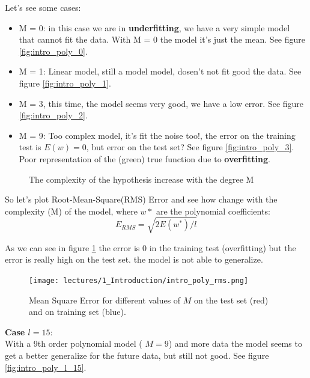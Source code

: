 \documentclass[../main.tex]{subfiles}
\begin{document}
Let's see some cases:
\begin{itemize}
    \item M = 0: in this case we are in \textbf{underfitting}, we have a very simple model that cannot fit the data. With M = 0 the model it's just the mean. See figure \ref{fig:intro_poly_0}.
    \item M = 1: Linear model,  still a model model, dosen't not fit good the data. See figure \ref{fig:intro_poly_1}.
    \item M = 3, this time, the model seems very good, we have a low error. See figure \ref{fig:intro_poly_2}.
    \item M = 9: Too complex model, it's fit the noise too!, the error on the training test is $E(w) = 0$, but error on the test set?  See figure \ref{fig:intro_poly_3}. Poor representation of the (green) true function due to \textbf{overfitting}.
\end{itemize}

\begin{figure}[ht]
  \centering
  \caption{The complexity of the hypothesis increase with the degree M}
\end{figure}

So let's plot Root-Mean-Square(RMS) Error and see how change with the complexity (M) of the model, where $w*$ are the polynomial coefficients:
$$ E_{RMS} = \sqrt{2E(w^*)/l}$$

As we can see in figure \ref{fig:intro_poly_rms} the error is 0 in the training test (overfitting) but the error is really high on the test set. the model is not able to generalize.\\
\begin{figure}[ht]
    \centering
    \texttt{[image: lectures/1\_Introduction/intro\_poly\_rms.png]}
    \caption{Mean Square Error for different values of $M$ on the test set (red) and on training set (blue).}
    \label{fig:intro_poly_rms}
\end{figure}


\noindent \textbf{Case $l = 15$}:\\
With a 9th order polynomial model ( $M = 9$) and more data the model seems to get a better generalize for the future data, but still not good. See figure \ref{fig:intro_poly_l_15}.
\end{document}
